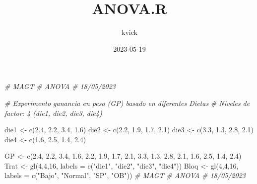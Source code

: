 \documentclass[
]{article}
\title{ANOVA.R}
\author{kvick}
\date{2023-05-19}
\newenvironment{Shaded}{\begin{snugshade}}{\end{snugshade}}
\newcommand{\AttributeTok}[1]{\textcolor[rgb]{0.77,0.63,0.00}{#1}}
\newcommand{\CommentTok}[1]{\textcolor[rgb]{0.56,0.35,0.01}{\textit{#1}}}
\newcommand{\DecValTok}[1]{\textcolor[rgb]{0.00,0.00,0.81}{#1}}
\newcommand{\FloatTok}[1]{\textcolor[rgb]{0.00,0.00,0.81}{#1}}
\newcommand{\FunctionTok}[1]{\textcolor[rgb]{0.00,0.00,0.00}{#1}}
\newcommand{\NormalTok}[1]{#1}
\newcommand{\OtherTok}[1]{\textcolor[rgb]{0.56,0.35,0.01}{#1}}
\newcommand{\StringTok}[1]{\textcolor[rgb]{0.31,0.60,0.02}{#1}}
\begin{document}
\maketitle

\begin{Shaded}
\begin{Highlighting}[]
\CommentTok{\# MAGT}
\CommentTok{\# ANOVA}
\CommentTok{\# 18/05/2023}

\CommentTok{\# Experimento ganancia en peso (GP) basado en diferentes Dietas }
\CommentTok{\# Niveles de factor: 4 (die1, die2, die3, die4)}

\NormalTok{die1 }\OtherTok{\textless{}{-}} \FunctionTok{c}\NormalTok{(}\FloatTok{2.4}\NormalTok{, }\FloatTok{2.2}\NormalTok{, }\FloatTok{3.4}\NormalTok{, }\FloatTok{1.6}\NormalTok{)}
\NormalTok{die2 }\OtherTok{\textless{}{-}} \FunctionTok{c}\NormalTok{(}\FloatTok{2.2}\NormalTok{, }\FloatTok{1.9}\NormalTok{, }\FloatTok{1.7}\NormalTok{, }\FloatTok{2.1}\NormalTok{)}
\NormalTok{die3 }\OtherTok{\textless{}{-}} \FunctionTok{c}\NormalTok{(}\FloatTok{3.3}\NormalTok{, }\FloatTok{1.3}\NormalTok{, }\FloatTok{2.8}\NormalTok{, }\FloatTok{2.1}\NormalTok{)}
\NormalTok{die4 }\OtherTok{\textless{}{-}} \FunctionTok{c}\NormalTok{(}\FloatTok{1.6}\NormalTok{, }\FloatTok{2.5}\NormalTok{, }\FloatTok{1.4}\NormalTok{, }\FloatTok{2.4}\NormalTok{)}

\NormalTok{GP }\OtherTok{\textless{}{-}} \FunctionTok{c}\NormalTok{(}\FloatTok{2.4}\NormalTok{, }\FloatTok{2.2}\NormalTok{, }\FloatTok{3.4}\NormalTok{, }\FloatTok{1.6}\NormalTok{, }\FloatTok{2.2}\NormalTok{, }\FloatTok{1.9}\NormalTok{, }\FloatTok{1.7}\NormalTok{, }\FloatTok{2.1}\NormalTok{,}
        \FloatTok{3.3}\NormalTok{, }\FloatTok{1.3}\NormalTok{, }\FloatTok{2.8}\NormalTok{, }\FloatTok{2.1}\NormalTok{, }\FloatTok{1.6}\NormalTok{, }\FloatTok{2.5}\NormalTok{, }\FloatTok{1.4}\NormalTok{, }\FloatTok{2.4}\NormalTok{)}
\NormalTok{Trat }\OtherTok{\textless{}{-}} \FunctionTok{gl}\NormalTok{(}\DecValTok{4}\NormalTok{,}\DecValTok{4}\NormalTok{,}\DecValTok{16}\NormalTok{, }\AttributeTok{labels =} \FunctionTok{c}\NormalTok{(}\StringTok{"die1"}\NormalTok{, }\StringTok{"die2"}\NormalTok{, }\StringTok{"die3"}\NormalTok{, }\StringTok{"die4"}\NormalTok{))}
\NormalTok{Bloq }\OtherTok{\textless{}{-}} \FunctionTok{gl}\NormalTok{(}\DecValTok{4}\NormalTok{,}\DecValTok{4}\NormalTok{,}\DecValTok{16}\NormalTok{, }\AttributeTok{labels =} \FunctionTok{c}\NormalTok{(}\StringTok{"Bajo"}\NormalTok{, }\StringTok{"Normal"}\NormalTok{, }\StringTok{"SP"}\NormalTok{, }\StringTok{"OB"}\NormalTok{))}
\CommentTok{\# MAGT}
\CommentTok{\# ANOVA}
\CommentTok{\# 18/05/2023}


\end{Highlighting}
\end{Shaded}
\end{document}
